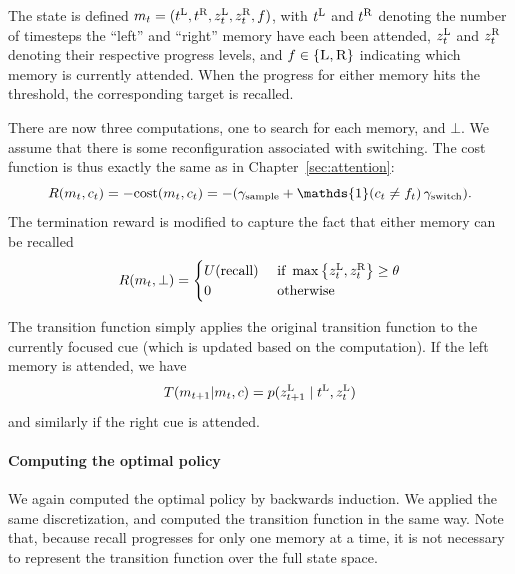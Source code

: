 The state is defined $m_t = (t^{\text{L}}, t^{\text{R}}, z_t^{\text{L}}, z_t^{\text{R}}, f)$, with $t^{\text{L}}$ and $t^{\text{R}}$ denoting the number of timesteps the ``left'' and ``right'' memory have each been attended, $z_t^{\text{L}}$ and $z_t^{\text{R}}$ denoting their respective progress levels, and $f \in \{\textsc{L}, \textsc{R}\}$ indicating which memory is currently attended. When the progress for either memory hits the threshold, the corresponding target is recalled.

There are now three computations, one to search for each memory, and $\bot$. We assume that there is some reconfiguration associated with switching. The cost function is thus exactly the same as in Chapter~\ref{sec:attention}:
\begin{equation}
R(m_t, c_t) = -\cost(m_t, c_t) = -(\samplecost + \mathds{1}(c_t \neq \last_t)\,\switchcost).
\end{equation}
The termination reward is modified to capture the fact that either memory can be recalled
%
\begin{equation}\label{eq:reward2}
  R(m_t, \bot) = \begin{cases} 
    U({\text{recall}}) & \text{ if } \max\left\{z_t^{\text{L}}, z_t^{\text{R}}\right\} \geq \theta \\
    0 & \text{ otherwise }
  \end{cases}
\end{equation}

The transition function simply applies the original transition function to the currently focused cue (which is updated based on the computation). If the left memory is attended, we have
%
\begin{equation}\label{eq:transition2}
  T(m_{t+1} | m_t, c) = p(z_{t+1}^{\text{L}} \mid t^{\text{L}}, z_t^{\text{L}})
\end{equation}
and similarly if the right cue is attended.


\paragraph{Computing the optimal policy}

We again computed the optimal policy by backwards induction. We applied the same discretization, and computed the transition function in the same way. Note that, because recall progresses for only one memory at a time, it is not necessary to represent the transition function over the full state space.

